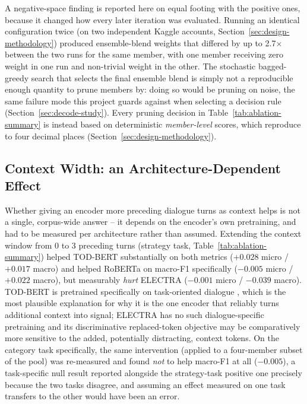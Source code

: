 A negative-space finding is reported here on equal footing with the positive
ones, because it changed how every later iteration was evaluated. Running an
identical configuration twice (on two independent Kaggle accounts,
Section~\ref{sec:design-methodology}) produced ensemble-blend weights that
differed by up to 2.7$\times$ between the two runs for the same member, with
one member receiving zero weight in one run and non-trivial weight in the
other. The stochastic bagged-greedy search that selects the final ensemble
blend is simply not a reproducible enough quantity to prune members by:
doing so would be pruning on noise, the same failure mode this project
guards against when selecting a decision rule (Section~\ref{sec:decode-study}).
Every pruning decision in Table~\ref{tab:ablation-summary} is instead based
on deterministic \emph{member-level} scores, which reproduce to four decimal
places (Section~\ref{sec:design-methodology}).

\subsection{Context Width: an Architecture-Dependent Effect}
\label{sec:ablation-context}

Whether giving an encoder more preceding dialogue turns as context helps is
not a single, corpus-wide answer -- it depends on the encoder's own
pretraining, and had to be measured per architecture rather than assumed.
Extending the context window from 0 to 3 preceding turns (strategy task,
Table~\ref{tab:ablation-summary}) helped TOD-BERT substantially on both
metrics ($+0.028$ micro / $+0.017$ macro) and helped RoBERTa on macro-F1
specifically ($-0.005$ micro / $+0.022$ macro), but measurably \emph{hurt}
ELECTRA ($-0.001$ micro / $-0.039$ macro). TOD-BERT is pretrained
specifically on task-oriented dialogue \citep{wu2020todbert}, which is the
most plausible explanation for why it is the one encoder that reliably turns
additional context into signal; ELECTRA has no such dialogue-specific
pretraining and its discriminative replaced-token objective may be
comparatively more sensitive to the added, potentially distracting, context
tokens. On the category task specifically, the same intervention (applied to
a four-member subset of the pool) was re-measured and found \emph{not} to
help macro-F1 at all ($-0.005$), a task-specific null result reported
alongside the strategy-task positive one precisely because the two tasks
disagree, and assuming an effect measured on one task transfers to the other
would have been an error.

